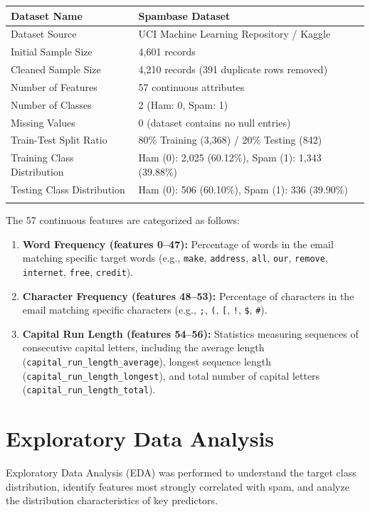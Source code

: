 \documentclass[12pt,a4paper]{article}
\begin{document}
\begin{longtable}{|p{6cm}|p{8cm}|}
\hline
Dataset Name & Spambase Dataset \\ \hline
Dataset Source & UCI Machine Learning Repository / Kaggle \\ \hline
Initial Sample Size & 4,601 records \\ \hline
Cleaned Sample Size & 4,210 records (391 duplicate rows removed) \\ \hline
Number of Features & 57 continuous attributes \\ \hline
Number of Classes & 2 (Ham: 0, Spam: 1) \\ \hline
Missing Values & 0 (dataset contains no null entries) \\ \hline
Train-Test Split Ratio & 80\% Training (3,368) / 20\% Testing (842) \\ \hline
Training Class Distribution & Ham (0): 2,025 (60.12\%), Spam (1): 1,343 (39.88\%) \\ \hline
Testing Class Distribution & Ham (0): 506 (60.10\%), Spam (1): 336 (39.90\%) \\ \hline
\label{tab:dataset_summary}
\end{longtable}

The 57 continuous features are categorized as follows:
\begin{enumerate}
    \item \textbf{Word Frequency (features 0--47):} Percentage of words in the email matching specific target words (e.g., \texttt{make}, \texttt{address}, \texttt{all}, \texttt{our}, \texttt{remove}, \texttt{internet}, \texttt{free}, \texttt{credit}).
    \item \textbf{Character Frequency (features 48--53):} Percentage of characters in the email matching specific characters (e.g., \texttt{;}, \texttt{(}, \texttt{[}, \texttt{!}, \texttt{\$}, \texttt{\#}).
    \item \textbf{Capital Run Length (features 54--56):} Statistics measuring sequences of consecutive capital letters, including the average length (\texttt{capital\_run\_length\_average}), longest sequence length (\texttt{capital\_run\_length\_longest}), and total number of capital letters (\texttt{capital\_run\_length\_total}).
\end{enumerate}

\section{Exploratory Data Analysis}
Exploratory Data Analysis (EDA) was performed to understand the target class distribution, identify features most strongly correlated with spam, and analyze the distribution characteristics of key predictors.
\end{document}
